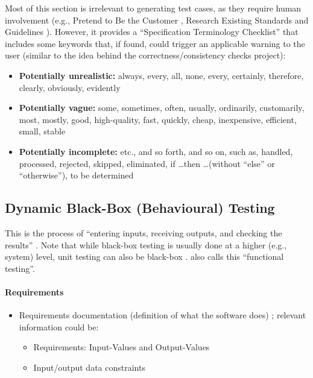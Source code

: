 Most of this section is irrelevant to generating test cases, as they require
human involvement  (e.g., Pretend to Be the Customer
\cite[p.~57-58]{patton_software_2006}, Research Existing Standards and
Guidelines \cite[p.~58-59]{patton_software_2006}). However, it provides a
``Specification Terminology Checklist'' \cite[p.~61]{patton_software_2006} that
includes some keywords that, if found, could trigger an applicable warning to
the user (similar to the idea behind the correctness/consistency checks
project):

\begin{itemize}
      \item \textbf{Potentially unrealistic:} always, every, all, none, every,
            certainly, therefore, clearly, obviously, evidently
      \item \textbf{Potentially vague:} some, sometimes, often, usually,
            ordinarily, customarily, most, mostly, good, high-quality, fast,
            quickly, cheap, inexpensive, efficient, small, stable
      \item \textbf{Potentially incomplete:} etc., and so forth, and so on,
            such as, handled, processed, rejected, skipped, eliminated,
            if \dots then \dots (without ``else'' or ``otherwise''),
            to be determined \cite[p.~408]{van_vliet_software_2000}
\end{itemize}

\subsection{Dynamic Black-Box (Behavioural) Testing
      \cite[p.~64-65]{patton_software_2006}}

This is the process of ``entering inputs, receiving outputs, and checking the
results'' \cite[p.~64]{patton_software_2006}. Note that while black-box testing
is usually done at a higher (e.g., system) level, unit testing can also be
black-box \cite[p.~1]{jacob_comparative_2016}. \cite{van_vliet_software_2000}
also calls this ``functional testing''.

\paragraph{Requirements}
\begin{itemize}
      \item Requirements documentation (definition of what the software does)
            \cite[p.~64]{patton_software_2006}; relevant information could be:
            \begin{itemize}
                  \item Requirements: Input-Values and Output-Values
                  \item Input/output data constraints
            \end{itemize}
\end{itemize}

